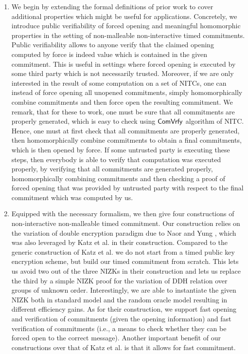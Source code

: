 \begin{enumerate}
\item We begin by extending the formal definitions of prior work to cover additional properties which might be useful for applications. Concretely, we introduce public verifiability of forced opening and meaningful homomorphic properties in the setting of non-malleable non-interactive timed commitments. Public verifiability allows to anyone verify that the claimed opening computed by force is indeed value which is contained in the given commitment. This is useful in settings where forced opening is executed by some third party which is not necessarily trusted. Moreover, if we are only interested in the result of some computation on a set of NITCs, one can instead of force opening all unopened commitments, simply homomorphically combine commitments and then force open the resulting commitment. We remark, that for these to work, one must be sure that all commitments are properly generated, which is easy to check using $\mathsf{ComVrfy}$ algorithm of NITC. Hence, one must at first check that all commitments are properly generated, then homomorphically combine commitments to obtain a final commitments, which is then opened by force. If some untrusted party is executing these steps, then everybody is able to verify that computation was executed properly, by verifying that all commitments are generated properly, homomorphically combining commitments and then checking a proof of forced opening that was provided by untrusted party with respect to the final commitment which was computed by us. 
\item Equipped with the necessary formalism, we then give four constructions of non-interactive non-malleable timed commitment. Our construction relies on the variation of double encryption paradigm due to Naor and Yung \cite{STOC:NaoYun90}, which was also leveraged by Katz et al. in their construction. Compared to the generic construction of Katz et al. we do not start from a timed public key encryption scheme, but build our timed commitment from scratch. This lets us avoid two out of the three NIZKs in their construction and lets us replace the third by a simple NIZK proof for the variation of DDH relation over groups of unknown order. Interestingly, we are able to instantiate the given NIZK both in standard model and the random oracle model resulting in different efficiency gains. As for their construction, we support fast opening and verification of commitments (given the opening information) and fast verification of commitments (i.e., a means to check whether they can be forced open to the correct message). Another important benefit of our constructions over that of Katz et al. is that it allows for fast commitment. 

\end{enumerate}
